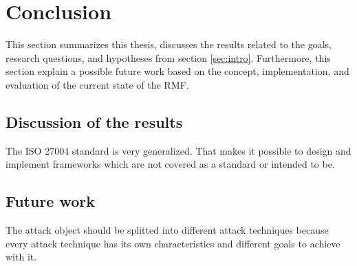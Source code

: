 \section{Conclusion}
\label{sec:conclusion}

This section summarizes this thesis, discusses the results related to the goals, research questions, and hypotheses from section \ref{sec:intro}. Furthermore, this section explain a possible future work based on the concept, implementation, and evaluation of the current state of the RMF.

\subsection{Discussion of the results}

The ISO 27004 standard is very generalized. That makes it possible to design and implement frameworks which are not covered as a standard or intended to be.

\subsection{Future work}

The attack object should be splitted into different attack techniques because every attack technique has its own characteristics and different goals to achieve with it.
